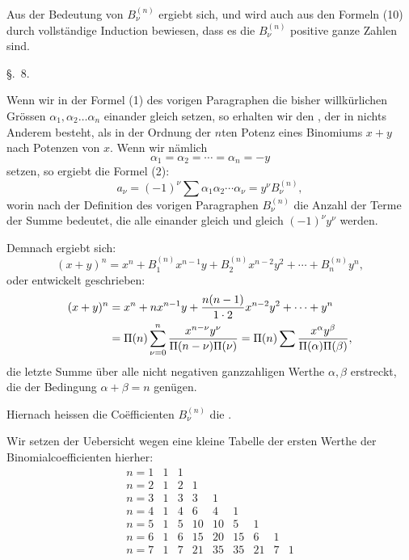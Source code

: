 
Aus der Bedeutung von $B_\nu^{(n)}$ ergiebt sich, und wird auch aus den Formeln (10) durch vollständige Induction bewiesen, dass es die $B_\nu^{(n)}$ positive ganze Zahlen sind.

\begin{center}
{\large \S.\ 8.}

\vspace{0.5em}
{\large{}}
\end{center}

Wenn wir in der Formel (1) des vorigen Paragraphen die bisher willkürlichen Grössen $\alpha_1,\alpha_2\ldots \alpha_n$ einander gleich setzen, so erhalten wir den , der in nichts Anderem besteht, als in der Ordnung der $n$ten Potenz eines Binomiums $x+y$ nach Potenzen von $x$. Wenn wir nämlich
\[
 \alpha_1=\alpha_2=\cdots=\alpha_n=-y
\]
setzen, so ergiebt die Formel (2):
\[
 a_\nu=(-1)^\nu \sum \alpha_1\alpha_2\cdots\alpha_\nu=y^\nu B_\nu^{(n)},
\]
worin nach der Definition des vorigen Paragraphen $B_\nu^{(n)}$ die Anzahl der Terme der Summe bedeutet, die alle einander gleich und gleich $(-1)^\nu y^\nu$ werden.

Demnach ergiebt sich:
\begin{equation}
 (x+y)^n=x^n+B_1^{(n)}x^{n-1}y+B_2^{(n)}x^{n-2}y^2+\cdots+B_n^{(n)}y^n,
\tag{1}
\end{equation}
oder entwickelt geschrieben:
\[
\begin{aligned}
(x+y)^n
&=x^n+nx^{n-1}y+{n(n-1)\over 1\cdot2}x^{n-2}y^2+\cdots+y^n\\
&=\Pi(n)\sum_{\nu=0}^{n} {x^{n-\nu}y^\nu\over \Pi(n-\nu)\Pi(\nu)}
 =\Pi(n)\sum {x^\alpha y^\beta\over \Pi(\alpha)\Pi(\beta)},
\end{aligned}
\]
die letzte Summe über alle nicht negativen ganzzahligen Werthe $\alpha,\beta$ erstreckt, die der Bedingung $\alpha+\beta=n$ genügen.

Hiernach heissen die Coëfficienten $B_\nu^{(n)}$ die .

Wir setzen der Uebersicht wegen eine kleine Tabelle der ersten Werthe der Binomialcoefficienten hierher:
\[
\begin{array}{crrrrrrrr}
 n=1&1&1\\
 n=2&1&2&1\\
 n=3&1&3&3&1\\
 n=4&1&4&6&4&1\\
 n=5&1&5&10&10&5&1\\
 n=6&1&6&15&20&15&6&1\\
 n=7&1&7&21&35&35&21&7&1
\end{array}
\]

